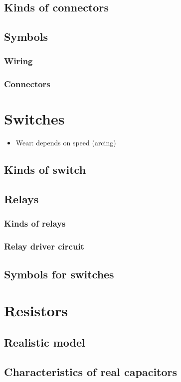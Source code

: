 \documentclass{report}
\begin{document}
\subsection{Kinds of connectors}
\subsection{Symbols}
\subsubsection{Wiring}
\subsubsection{Connectors}
\section{Switches}
\begin{itemize}
\item Wear: depends on speed (arcing)
\end{itemize}
\subsection{Kinds of switch}
\subsection{Relays}
\subsubsection{Kinds of relays}
\subsubsection{Relay driver circuit}
\subsection{Symbols for switches}
\section{Resistors}
\subsection{Realistic model}
\subsection{Characteristics of real capacitors}
\end{document}
